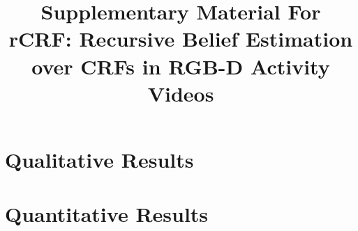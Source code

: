 \documentclass[conference]{IEEEtran}
\begin{document}
\title{Supplementary Material For \\ rCRF: Recursive Belief Estimation over CRFs in RGB-D Activity Videos}

\author{
\and
{}
}


\maketitle

\IEEEpeerreviewmaketitle
\section{Qualitative Results}


\section{Quantitative Results}
\end{document}
